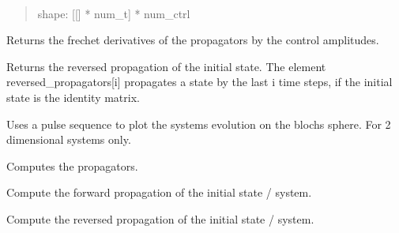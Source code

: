 \documentclass[letterpaper,10pt,english]{sphinxmanual}
\begin{document}
\begin{fulllineitems}
\begin{fulllineitems}
~\begin{quote}

shape: {[}{[}{]} * num\_t{]} * num\_ctrl
\end{quote}

Returns the frechet derivatives of the propagators by the control
amplitudes.

\end{fulllineitems}



\begin{fulllineitems}
Returns the reversed propagation of the initial state. The element
reversed\_propagators{[}i{]} propagates a state by the last i time steps, if
the initial state is the identity matrix.

\end{fulllineitems}



\begin{fulllineitems}
Uses a pulse sequence to plot the systems evolution on the blochs
sphere. For 2 dimensional systems only.

\end{fulllineitems}



\begin{fulllineitems}
Computes the propagators.

\end{fulllineitems}



\begin{fulllineitems}
Compute the forward propagation of the initial state / system.

\end{fulllineitems}



\begin{fulllineitems}
Compute the reversed propagation of the initial state / system.

\end{fulllineitems}




\end{fulllineitems}
\end{document}
